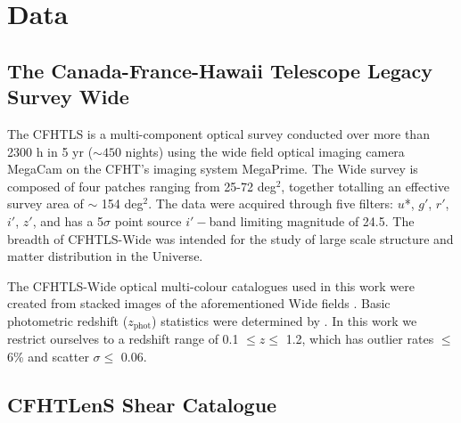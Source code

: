 
\section{Data}
\label{data}


\subsection{The Canada-France-Hawaii Telescope Legacy Survey Wide}

The \acf{CFHTLS} is a multi-component optical survey conducted over more than 2300 h in 5 yr ($\sim450$ nights) using the wide field optical imaging camera MegaCam on the \ac{CFHT}'s imaging system MegaPrime. The Wide survey is composed of four patches ranging from 25-72 deg$^2$, together totalling an effective survey area of $\sim$ 154 deg$^2$. The data were acquired through five filters: $u$*, $g'$, $r'$, $i'$, $z'$, and has a 5$\sigma$ point source $i'-$band limiting magnitude of 24.5. The breadth of \ac{CFHTLS}-Wide was intended for the study of large scale structure and matter distribution in the Universe.

The \ac{CFHTLS}-Wide optical multi-colour catalogues used in this work were created from stacked images of the aforementioned Wide fields \citep[see][for details on the data processing and multi-colour catalogue creation]{Erben09, Hildebrandt09a, Hildebrandt12, Erben13}. Basic photometric redshift ($z_{\mathrm{phot}}$) statistics were determined by \citet{Hildebrandt12}. In this work we restrict ourselves to a redshift range of 0.1 $\leq z \leq$ 1.2, which has outlier rates $\leq$ 6\% and scatter $\sigma \leq$ 0.06.


\subsection{\ac{CFHTLenS} Shear Catalogue}

